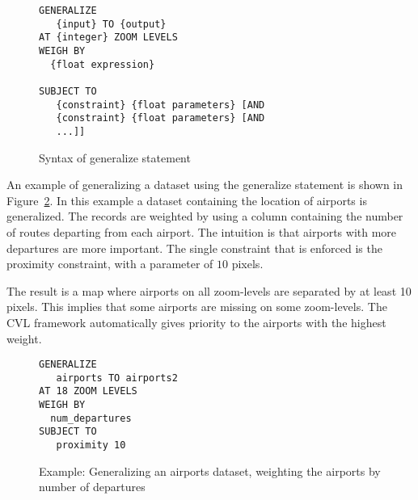 \begin{figure}[htbp]
\begin{center}
\begin{lstlisting}
GENERALIZE 
   {input} TO {output}
AT {integer} ZOOM LEVELS
WEIGH BY
  {float expression}

SUBJECT TO 
   {constraint} {float parameters} [AND
   {constraint} {float parameters} [AND
   ...]]
\end{lstlisting}
\caption{Syntax of generalize statement}
\label{fig:generalize-syntax}
\end{center}
\end{figure}

An example of generalizing a dataset using the generalize statement is shown in Figure~\ref{fig:cvl-example-airports}. In this example a dataset containing the location of airports is generalized. The records are weighted by using a column containing the number of routes departing from each airport. The intuition is that airports with more departures are more important. The single constraint that is enforced is the proximity constraint, with a parameter of $10$ pixels.

The result is a map where airports on all zoom-levels are separated by at least 10 pixels. This implies that some airports are missing on some zoom-levels. The CVL framework automatically gives priority to the airports with the highest weight.

\begin{figure}[htbp]
\begin{center}
\begin{lstlisting}
GENERALIZE 
   airports TO airports2
AT 18 ZOOM LEVELS
WEIGH BY
  num_departures
SUBJECT TO 
   proximity 10 
\end{lstlisting}
\caption{Example: Generalizing an airports dataset, weighting the airports by number of departures}
\label{fig:cvl-example-airports}
\end{center}
\end{figure}





